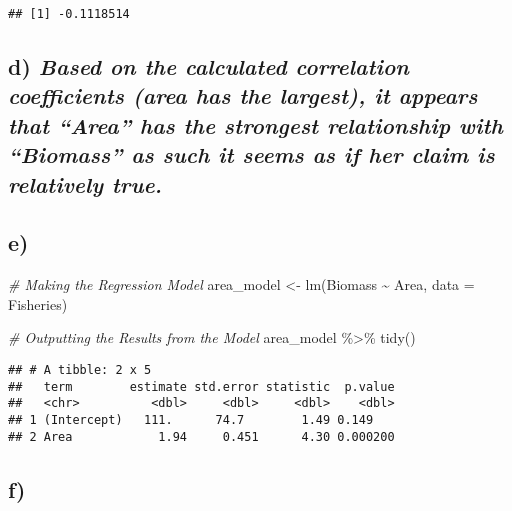 \documentclass[
]{article}
\newenvironment{Shaded}{\begin{snugshade}}{\end{snugshade}}
\newcommand{\AttributeTok}[1]{\textcolor[rgb]{0.77,0.63,0.00}{#1}}
\newcommand{\CommentTok}[1]{\textcolor[rgb]{0.56,0.35,0.01}{\textit{#1}}}
\newcommand{\FunctionTok}[1]{\textcolor[rgb]{0.00,0.00,0.00}{#1}}
\newcommand{\NormalTok}[1]{#1}
\newcommand{\OtherTok}[1]{\textcolor[rgb]{0.56,0.35,0.01}{#1}}
\newcommand{\SpecialCharTok}[1]{\textcolor[rgb]{0.00,0.00,0.00}{#1}}
\begin{document}
\begin{verbatim}
## [1] -0.1118514
\end{verbatim}

\hypertarget{d-based-on-the-calculated-correlation-coefficients-area-has-the-largest-it-appears-that-area-has-the-strongest-relationship-with-biomass-as-such-it-seems-as-if-her-claim-is-relatively-true.}{%
\subsection{\texorpdfstring{d) \emph{Based on the calculated correlation
coefficients (area has the largest), it appears that ``Area'' has the
strongest relationship with ``Biomass'' as such it seems as if her claim
is relatively
true.}}{d) Based on the calculated correlation coefficients (area has the largest), it appears that ``Area'' has the strongest relationship with ``Biomass'' as such it seems as if her claim is relatively true.}}\label{d-based-on-the-calculated-correlation-coefficients-area-has-the-largest-it-appears-that-area-has-the-strongest-relationship-with-biomass-as-such-it-seems-as-if-her-claim-is-relatively-true.}}

\hypertarget{e}{%
\subsection{e)}\label{e}}

\begin{Shaded}
\begin{Highlighting}[]
\CommentTok{\# Making the Regression Model}
\NormalTok{area\_model }\OtherTok{\textless{}{-}} \FunctionTok{lm}\NormalTok{(Biomass }\SpecialCharTok{\textasciitilde{}}\NormalTok{ Area, }\AttributeTok{data =}\NormalTok{ Fisheries)}

\CommentTok{\# Outputting the Results from the Model}
\NormalTok{area\_model }\SpecialCharTok{\%\textgreater{}\%}
  \FunctionTok{tidy}\NormalTok{()}
\end{Highlighting}
\end{Shaded}

\begin{verbatim}
## # A tibble: 2 x 5
##   term        estimate std.error statistic  p.value
##   <chr>          <dbl>     <dbl>     <dbl>    <dbl>
## 1 (Intercept)   111.      74.7        1.49 0.149   
## 2 Area            1.94     0.451      4.30 0.000200
\end{verbatim}

\hypertarget{f}{%
\subsection{f)}\label{f}}
\end{document}
